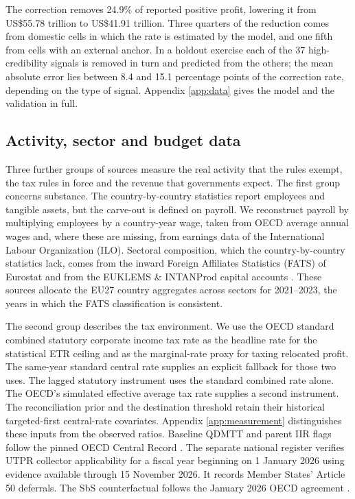 \documentclass[11pt,a4paper]{article}
\newcommand{\usd}{US\$}
\begin{document}
The correction removes 24.9\% of reported positive profit, lowering it from \usd55.78 trillion to \usd41.91 trillion. Three quarters of the reduction comes from domestic cells in which the rate is estimated by the model, and one fifth from cells with an external anchor. In a holdout exercise each of the 37 high-credibility signals is removed in turn and predicted from the others; the mean absolute error lies between 8.4 and 15.1 percentage points of the correction rate, depending on the type of signal. Appendix \ref{app:data} gives the model and the validation in full.

\subsection{Activity, sector and budget data}\label{sec:otherdata}

Three further groups of sources measure the real activity that the rules exempt, the tax rules in force and the revenue that governments expect. The first group concerns substance. The country-by-country statistics report employees and tangible assets, but the carve-out is defined on payroll. We reconstruct payroll by multiplying employees by a country-year wage, taken from OECD average annual wages and, where these are missing, from earnings data of the International Labour Organization (ILO). Sectoral composition, which the country-by-country statistics lack, comes from the inward Foreign Affiliates Statistics (FATS) of Eurostat and from the EUKLEMS \& INTANProd capital accounts \citep{eurostat2025fats,euklemsintanprod2025}. These sources allocate the EU27 country aggregates across sectors for 2021–2023, the years in which the FATS classification is consistent.

The second group describes the tax environment. We use the OECD standard combined statutory corporate income tax rate as the headline rate for the statistical ETR ceiling and as the marginal-rate proxy for taxing relocated profit. The same-year standard central rate supplies an explicit fallback for those two uses. The lagged statutory instrument uses the standard combined rate alone. The OECD's simulated effective average tax rate supplies a second instrument. The reconciliation prior and the destination threshold retain their historical targeted-first central-rate covariates. Appendix \ref{app:measurement} distinguishes these inputs from the observed ratios. Baseline QDMTT and parent IIR flags follow the pinned OECD Central Record \citep{oecdCentralRecord2026}. The separate national register verifies UTPR collector applicability for a fiscal year beginning on 1 January 2026 using evidence available through 15 November 2026. It records Member States' Article 50 deferrals. The SbS counterfactual follows the January 2026 OECD agreement \citep{oecd2026}.
\end{document}
